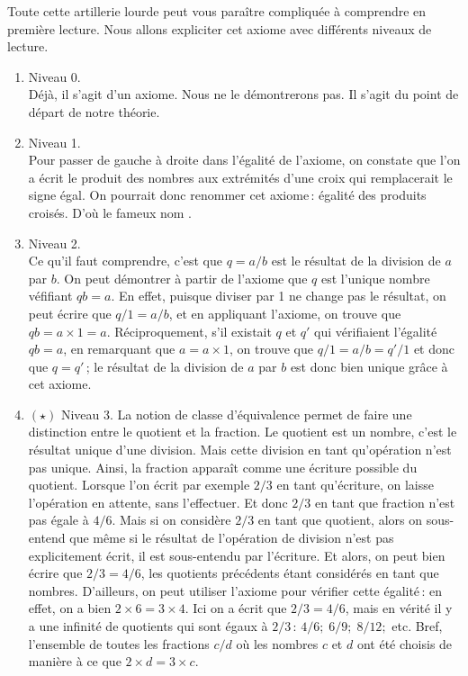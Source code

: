 		Toute cette artillerie lourde peut vous paraître compliquée à comprendre en première lecture. Nous allons expliciter cet axiome avec différents niveaux de lecture.
		\begin{enumerate}
			\item Niveau 0. \\ Déjà, il s'agit d'un axiome. Nous ne le démontrerons pas. Il s'agit du point de départ de notre théorie. 
			\item Niveau 1. \\ Pour passer de gauche à droite dans l'égalité de l'axiome, on constate que l'on a écrit le produit des nombres aux extrémités d'une croix qui remplacerait le signe égal. On pourrait donc renommer cet axiome\,: égalité des produits croisés. D'où le fameux nom .
			\item Niveau 2. \\ Ce qu'il faut comprendre, c'est que $q=a/b$ est le résultat de la division de $a$ par $b$. On peut démontrer à partir de l'axiome que $q$ est l'unique nombre véfifiant $qb=a$. En effet, puisque diviser par 1 ne change pas le résultat, on peut écrire que $q/1=a/b$, et en appliquant l'axiome, on trouve que $qb=a\times1=a$. Réciproquement, s'il existait $q$ et $q'$ qui vérifiaient l'égalité $qb=a$, en remarquant que $a=a\times 1$, on trouve que $q/1=a/b=q'/1$ et donc que $q=q'$\,; le résultat de la division de $a$ par $b$ est donc bien unique grâce à cet axiome.
			\item $(\star)$ Niveau 3. La notion de classe d'équivalence permet de faire une distinction entre le quotient et la fraction. Le quotient est un nombre, c'est le résultat unique d'une division. Mais cette division en tant qu'opération n'est pas unique. Ainsi, la fraction apparaît comme une écriture possible du quotient. Lorsque l'on écrit par exemple $2/3$ en tant qu'écriture, on laisse l'opération en attente, sans l'effectuer. Et donc $2/3$ en tant que fraction n'est pas égale à $4/6$. Mais si on considère $2/3$ en tant que quotient, alors on sous-entend que même si le résultat de l'opération de division n'est pas explicitement écrit, il est sous-entendu par l'écriture. Et alors, on peut bien écrire que $2/3=4/6$, les quotients précédents étant considérés en tant que nombres. D'ailleurs, on peut utiliser l'axiome pour vérifier cette égalité\,: en effet, on a bien $2\times6=3\times4$. Ici on a écrit que $2/3=4/6$, mais en vérité il y a une infinité de quotients qui sont égaux à $2/3$\,: $4/6;\;6/9;\;8/12;$ etc. Bref, l'ensemble de toutes les fractions $c/d$ où les nombres $c$ et $d$ ont été choisis de manière à ce que $2\times d=3\times c$.  
		\end{enumerate}

